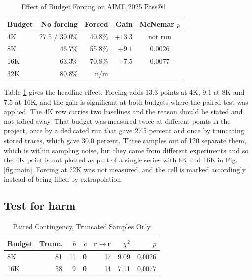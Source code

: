 \documentclass[conference]{IEEEtran}
\begin{document}
\begin{table}[t]
\caption{Effect of Budget Forcing on AIME 2025 Pass@1}
\label{tab:main}
\centering
\footnotesize
\begin{tabular}{@{}lrrrc@{}}
\toprule
\textbf{Budget} & \textbf{No forcing} & \textbf{Forced} & \textbf{Gain} &
\textbf{McNemar $p$} \\
\midrule
4K  & 27.5 / 30.0\% & 40.8\% & $+13.3$ & not run \\
8K  & 46.7\%        & 55.8\% & $+9.1$  & $\mathbf{0.0026}$ \\
16K & 63.3\%        & 70.8\% & $+7.5$  & $\mathbf{0.0077}$ \\
32K & 80.8\%        & n/m    &         & \\
\bottomrule
\end{tabular}
\end{table}

Table \ref{tab:main} gives the headline effect. Forcing adds 13.3 points at 4K,
9.1 at 8K and 7.5 at 16K, and the gain is significant at both budgets where the
paired test was applied. The 4K row carries two baselines and the reason should be
stated and not tidied away. That budget was measured twice at different points
in the project, once by a dedicated run that gave 27.5 percent and once by
truncating stored traces, which gave 30.0 percent. Three samples out of 120
separate them, which is within sampling noise, but they came from different
experiments and so the 4K point is not plotted as part of a single series with 8K
and 16K in Fig. \ref{fig:main}. Forcing at 32K was not measured, and the cell is
marked accordingly instead of being filled by extrapolation.

\subsection{Test for harm}

\begin{table}[t]
\caption{Paired Contingency, Truncated Samples Only}
\label{tab:paired}
\centering
\footnotesize
\begin{tabular}{@{}lrrrrrr@{}}
\toprule
\textbf{Budget} & \textbf{Trunc.} & \textbf{$b$} & \textbf{$c$} &
\textbf{r$\rightarrow$r} & \textbf{$\chi^2$} & \textbf{$p$} \\
\midrule
8K  & 81 & 11 & \textbf{0} & 17 & 9.09 & 0.0026 \\
16K & 58 & 9  & \textbf{0} & 14 & 7.11 & 0.0077 \\
\bottomrule
\end{tabular}
\end{table}
\end{document}
